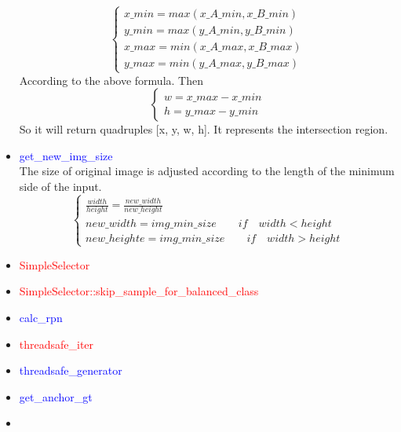 \documentclass[UTF8,a4paper,11pt]{ctexart}
\begin{document}
\begin{itemize}
            \begin{equation}
                \begin{cases}
                    x\_min = max(x\_A\_min, x\_B\_min) \\
                    y\_min = max(y\_A\_min, y\_B\_min) \\
                    x\_max = min(x\_A\_max, x\_B\_max) \\
                    y\_max = min(y\_A\_max, y\_B\_max)
                \end{cases}
            \end{equation}
            According to the above formula. Then
            \begin{equation}
                \begin{cases}
                    w = x\_max - x\_min \\
                    h = y\_max - y\_min
                \end{cases}
            \end{equation}
            So it will return quadruples [x, y, w, h]. It represents the intersection region.
            \item {\textcolor{blue}{get\_new\_img\_size}} \\
            The size of original image is adjusted according to the length of the minimum side of the input.
            \begin{displaymath}
                \begin{cases}
                    \frac{width}{height} = \frac{new\_width}{new\_height} \\
                    new\_width = img\_min\_size \qquad if \quad width < height \\ 
                    new\_heighte = img\_min\_size \qquad if \quad width > height
                \end{cases}
            \end{displaymath}
            \item {\textcolor{red}{SimpleSelector}}
            
            \item {\textcolor{red}{SimpleSelector::skip\_sample\_for\_balanced\_class}}

            \item {\textcolor{blue}{calc\_rpn}}
            \item {\textcolor{red}{threadsafe\_iter}}
            \item {\textcolor{blue}{threadsafe\_generator}}
            \item {\textcolor{blue}{get\_anchor\_gt}}
            \item {}
        \end{itemize}
\end{document}
